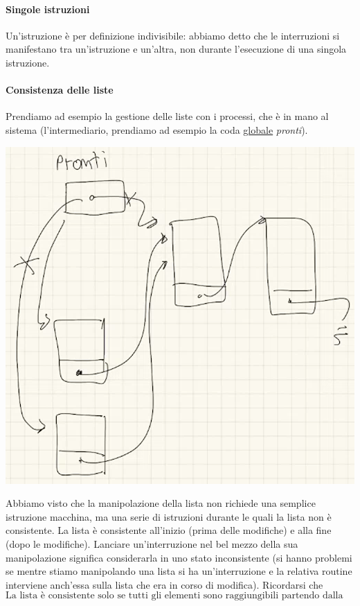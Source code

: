 \paragraph{Singole istruzioni} Un'istruzione è per definizione indivisibile: abbiamo detto che le interruzioni si manifestano tra un'istruzione e un'altra, non durante l'esecuzione di una singola istruzione.
\paragraph{Consistenza delle liste} Prendiamo ad esempio la gestione delle liste con i processi, che è in mano al sistema (l'intermediario, prendiamo ad esempio la coda \underline{globale} \emph{pronti}). 
\begin{center}\includegraphics[scale=.65]{img/129.PNG}\end{center}
Abbiamo visto che la manipolazione della lista non richiede una semplice istruzione macchina, ma una serie di istruzioni durante le quali la lista non è consistente. La lista è consistente all'inizio (prima delle modifiche) e alla fine (dopo le modifiche). Lanciare un'interruzione nel bel mezzo della sua manipolazione significa considerarla in uno stato inconsistente (si hanno problemi se mentre stiamo manipolando una lista si ha un'interruzione e la relativa routine interviene anch'essa sulla lista che era in corso di modifica).  Ricordarsi che
\[\boxed{\text{La lista è consistente solo se tutti gli elementi sono raggiungibili partendo dalla testa}}\]
